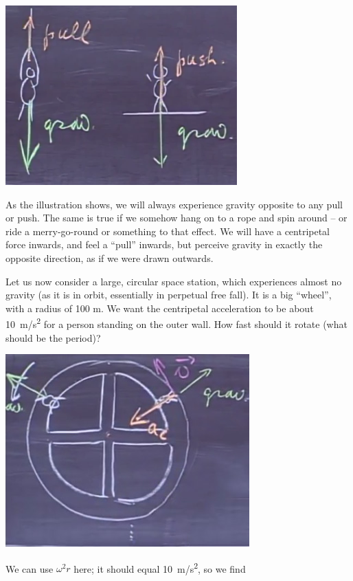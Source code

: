 \documentclass[8.01x]{subfiles}
\begin{document}
\begin{center}
\includegraphics[scale=0.6]{Graphics/lec5_gravity}
\end{center}

As the illustration shows, we will always experience gravity opposite to any pull or push. The same is true if we somehow hang on to a rope and spin around -- or ride a merry-go-round or something to that effect. We will have a centripetal force inwards, and feel a ``pull'' inwards, but perceive gravity in exactly the opposite direction, as if we were drawn outwards.

Let us now consider a large, circular space station, which experiences almost no gravity (as it is in orbit, essentially in perpetual free fall). It is a big ``wheel'', with a radius of 100 m. We want the centripetal acceleration to be about \SI{10}{m/s^2} for a person standing on the outer wall. How fast should it rotate (what should be the period)?

\begin{center}
\includegraphics[scale=0.6]{Graphics/lec5_space_station}
\end{center}

We can use $\omega^2 r$ here; it should equal \SI{10}{m/s^2}, so we find
\end{document}
